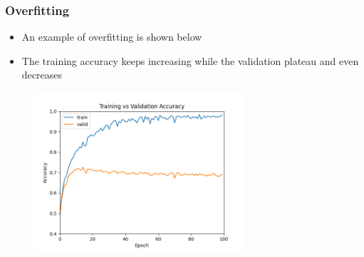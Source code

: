 \documentclass{beamer}
\begin{document}
\begin{frame}
    \frametitle{Overfitting}
\begin{itemize}
    \item An example of overfitting is shown below 
    \item The training accuracy keeps increasing while the validation plateau and even decreases
\end{itemize}
\begin{center}
    \begin{figure}
     \includegraphics[width=0.7\textwidth]{figs/train-vs-valid-acc.png}
        
    \end{figure}
\end{center}

\end{frame}
\end{document}
